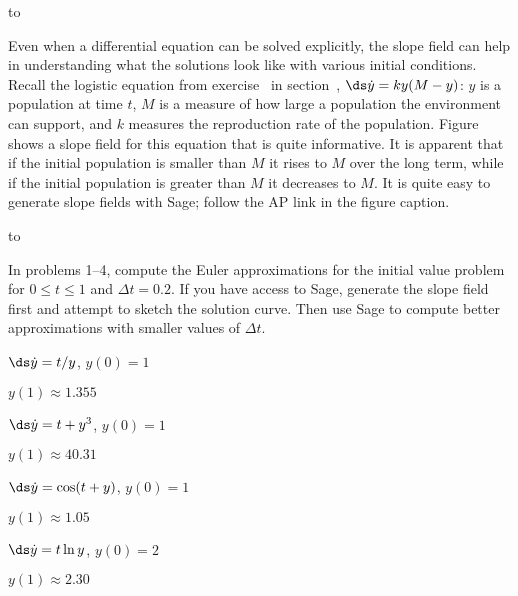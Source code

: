 \figure
\hbox to 

Even when a differential equation can be solved explicitly, the slope
field can help in understanding what the solutions look like with
various initial conditions. Recall the logistic equation from
exercise~ in 
section~, $\ds\dot y =
ky(M-y)$: $y$ is a population at time $t$, $M$ is a measure of how
large a population the environment can support, and $k$ measures the
reproduction rate of the population.
Figure~ shows a slope field
for this equation that is quite informative. 
It is apparent that if the initial population is smaller than $M$ it
rises to $M$ over the long term, while if the initial population is
greater than $M$ it decreases to $M$.
It is quite easy to
generate slope fields with Sage; follow the AP link in the figure caption.

\figure
\hbox to 
\endfigure{A slope field for $\ds\dot y=0.2y(10-y)$.
(\expandafter\url\expandafter{\sageurl 2380}%
AP\endurl)}

\begin{exercises}

In problems 1--4, compute the Euler approximations for the initial
value problem for $0\le t\le 1$ and $\Delta t=0.2$. If you have access
to Sage, generate the slope field first and attempt to sketch the
solution curve. Then use Sage to compute better approximations with
smaller values of $\Delta t$.

\begin{exercise} $\ds\dot y=t/y$, $y(0)=1$
\begin{answer} $y(1)\approx 1.355$
\end{answer}\end{exercise}

\begin{exercise} $\ds\dot y=t+y^3$, $y(0)=1$
\begin{answer} $y(1)\approx 40.31$
\end{answer}\end{exercise}

\begin{exercise} $\ds\dot y=\cos(t+y)$, $y(0)=1$
\begin{answer} $y(1)\approx 1.05$
\end{answer}\end{exercise}

\begin{exercise} $\ds\dot y=t\ln y$, $y(0)=2$
\begin{answer} $y(1)\approx 2.30$
\end{answer}\end{exercise}

\end{exercises}
